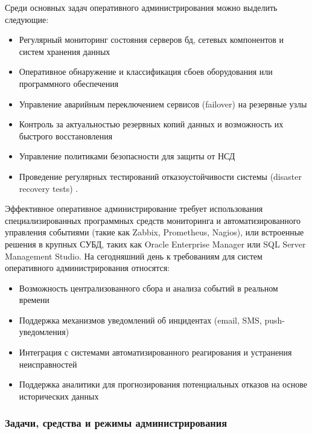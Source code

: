 Среди основных задач оперативного администрирования можно выделить следующие:
\begin{itemize}
    \item Регулярный мониторинг состояния серверов бд, сетевых компонентов и систем хранения данных
    \item Оперативное обнаружение и классификация сбоев оборудования или программного обеспечения
    \item Управление аварийным переключением сервисов (failover) на резервные узлы
    \item Контроль за актуальностью резервных копий данных и возможность их быстрого восстановления
    \item Управление политиками безопасности для защиты от НСД
    \item Проведение регулярных тестирований отказоустойчивости системы (disaster recovery tests) \autocite{Kleppmann}.
\end{itemize}

Эффективное оперативное администрирование требует использования специализированных программных средств мониторинга и автоматизированного управления событиями (такие как Zabbix, Prometheus, Nagios), или встроенные решения в крупных СУБД, таких как Oracle Enterprise Manager или SQL Server Management Studio.
На сегодняшний день к требованиям для систем оперативного администрирования относятся:
\begin{itemize}
    \item Возможность централизованного сбора и анализа событий в реальном времени
    \item Поддержка механизмов уведомлений об инцидентах (email, SMS, push-уведомления)
    \item Интеграция с системами автоматизированного реагирования и устранения неисправностей
    \item Поддержка аналитики для прогнозирования потенциальных отказов на основе исторических данных %
\end{itemize}




\subsubsection{Задачи, средства и режимы администрирования}

